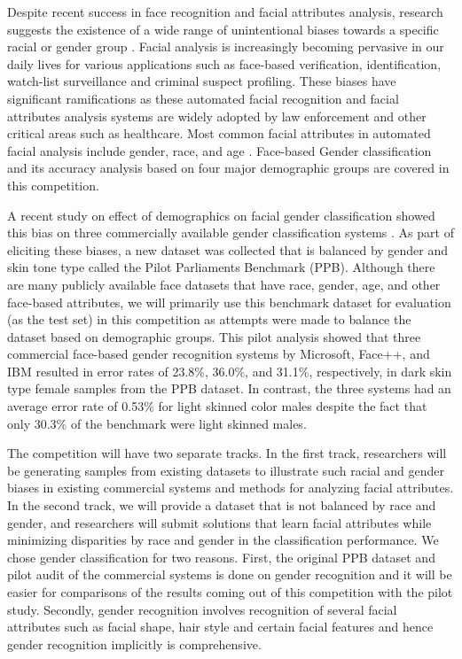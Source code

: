 \documentclass[11pt, oneside]{article}
\makeatletter
\let\@internalcite\cite
\def\cite{\def\citeauthoryear##1##2{##1, ##2}\@internalcite}
\makeatother
\begin{document}
Despite recent success in face recognition and facial attributes analysis,
research suggests the existence of a wide range of unintentional biases towards
a specific racial or gender group \cite{phillips2011other} \cite{klare2012face}.
Facial analysis is increasingly becoming pervasive in our daily lives for
various applications such as face-based verification, identification, 
watch-list surveillance and criminal suspect profiling.  These biases have 
significant ramifications as these automated facial recognition and facial 
attributes analysis systems are widely adopted by law enforcement and other 
critical areas such as healthcare. Most common facial attributes in automated 
facial analysis include gender, race, and age \cite{fu2014learning} 
\cite{ng2015review} \cite{han2015demographic}. Face-based Gender classification 
and its accuracy analysis based on four major demographic groups are covered in 
this competition.

A recent study on effect of demographics on facial gender classification
showed this bias on three commercially available gender classification systems
\cite{buolamwini2018gender}. As part of eliciting these biases, a new dataset
was collected that is balanced by gender and skin tone type called the Pilot
Parliaments Benchmark (PPB). Although there are many publicly available face
datasets that have race, gender, age, and other face-based attributes, we will
primarily use this benchmark dataset for evaluation (as the test set) in this
competition as attempts were made to balance the dataset based on demographic
groups. This pilot analysis showed that three commercial face-based gender
recognition systems by Microsoft, Face++, and IBM resulted in error rates of
23.8\%, 36.0\%, and 31.1\%, respectively, in dark skin type female samples from
the PPB dataset. In contrast, the three systems had an average error rate of
0.53\% for light skinned color males despite the fact that only 30.3\% of the
benchmark were light skinned males\cite{buolamwini2018gender}.

The competition will have two separate tracks. In the first track, researchers
will be generating samples from existing datasets to illustrate such racial and
gender biases in existing commercial systems and
methods for analyzing facial attributes. In the second track, we will provide a dataset that is not balanced by race and
gender, and researchers will submit solutions that learn facial attributes
while minimizing disparities by race and gender in the classification performance.
We chose gender classification for two reasons. First, the original PPB dataset
and pilot audit of the commercial systems is done on gender recognition and it
will be easier for comparisons of the results coming out of this competition
with the pilot study. Secondly, gender recognition involves recognition of
several facial attributes such as facial shape, hair style and certain facial
features and hence gender recognition implicitly is comprehensive.
\end{document}
